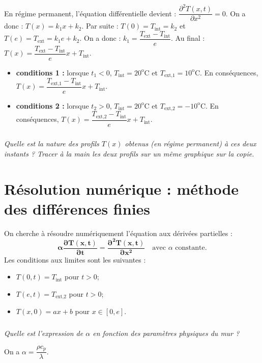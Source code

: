 \documentclass[10pt,fleqn]{article} %
\begin{document}
\begin{multicols}{2}
\ifprof
\begin{corrige} ~\\
En régime permanent, l'équation différentielle devient : $\dfrac{\partial^2 T(x,t)}{\partial x^2}=0$. On a donc :
$T(x) =  k_1 x + k_2 $. Par suite : $T(0)=T_{\text{int}}=k_2$ et $T(e)=T_{\text{ext}} = k_1 e + k_2 $. On a donc : 
$ k_1 =\dfrac{T_{\text{ext}} -T_{\text{int}}}{e} $. Au final : $T(x) =  \dfrac{T_{\text{ext}} -T_{\text{int}}}{e} x + T_{\text{int}} $.


\begin{itemize}
\item \textbf{conditions 1 : } lorsque $t_1 <0$,  $T_{\text{int}}=20^{\text{o}} \text{C}$ et $T_{\text{ext,1}}=10^{\text{o}} \text{C}$. En conséquences, $T(x) =  \dfrac{T_{\text{ext,1}} -T_{\text{int}}}{e} x + T_{\text{int}} $.
\item \textbf{conditions 2 : }  lorsque $t_2 >0$,  $T_{\text{int}}=20^{\text{o}} \text{C}$ et $T_{\text{ext,2}}=-10^{\text{o}} \text{C}$. En conséquences, $T(x) =  \dfrac{T_{\text{ext,2}} -T_{\text{int}}}{e} x + T_{\text{int}} $.
\end{itemize}
\end{corrige}
\else
\fi


\subparagraph{}\textit{Quelle est la nature des profils $T(x)$ obtenus (en régime permanent) à ces deux instants ? Tracer à la main les deux profils sur un même graphique sur la copie.}

\section*{Résolution numérique : méthode des différences finies}

\ifprof
\else
On cherche à résoudre numériquement l'équation aux dérivées partielles : 
\begin{equation}
\mathbf{\alpha \dfrac{\partial T(x,t)}{\partial t} = \dfrac{\partial^2 T(x,t)}{\partial x^2}} \quad \text{avec }\alpha \text{ constante.}
\end{equation}
Les conditions aux limites sont les suivantes :
\begin{itemize}
\item $T(0,t)=T_{\text{int}}$ pour $t>0$;
\item $T(e,t)=T_{\text{ext,2}}$ pour $t>0$;
\item $T(x,0)=ax + b$ pour $x\in[0,e]$.
\end{itemize}
\fi

\subparagraph{}\textit{Quelle est l'expression de $\alpha$ en fonction des paramètres physiques du mur ?}
\ifprof
\begin{corrige}
On a $\alpha =\dfrac{\rho c_p}{\lambda}$.


\end{corrige}
\end{multicols}
\end{document}
